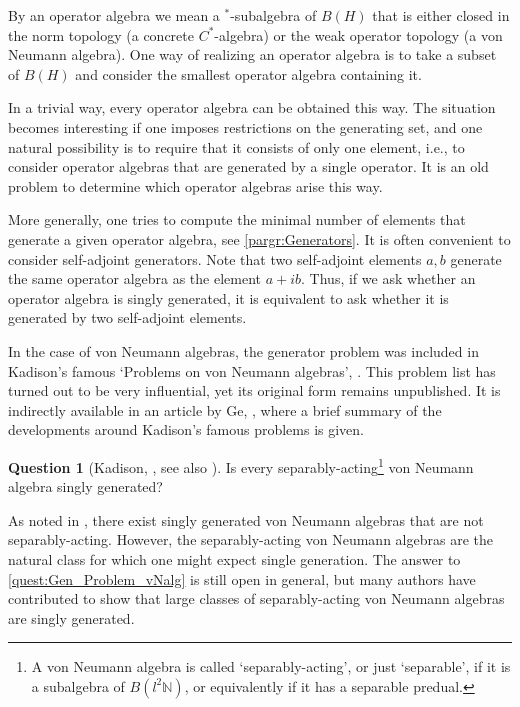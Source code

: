 \documentclass{amsart}
\theoremstyle{definition}
\newtheorem{quest}[questCt]{Question}
\begin{document}
    By an operator algebra we mean a $^{*}$-subalgebra of $B(H)$ that is either closed in the norm topology (a concrete {{$C^*$-al\-ge\-bra}}{}) or the weak operator topology (a von Neumann algebra).
    One way of realizing an operator algebra is to take a subset of $B(H)$ and consider the smallest operator algebra containing it.

    In a trivial way, every operator algebra can be obtained this way.
    The situation becomes interesting if one imposes restrictions on the generating set, and one natural possibility is to require that it consists of only one element, i.e., to consider operator algebras that are generated by a single operator.
    It is an old problem to determine which operator algebras arise this way.

    More generally, one tries to compute the minimal number of elements that generate a given operator algebra, see \ref{pargr:Generators}.
    It is often convenient to consider self-adjoint generators.
    Note that two self-adjoint elements $a,b$ generate the same operator algebra as the element $a+ib$.
    Thus, if we ask whether an operator algebra is singly generated, it is equivalent to ask whether it is generated by two self-adjoint elements.

    In the case of von Neumann algebras, the generator problem was included in Kadison's famous `Problems on von Neumann algebras', \cite{Kad1967}.
    This problem list has turned out to be very influential, yet its original form remains unpublished.
    It is indirectly available in an article by Ge, \cite{Ge2003}, where a brief summary of the developments around Kadison's famous problems is given.

\begin{quest}[{Kadison, \cite[Problem 14]{Kad1967}, see also \cite{Ge2003}}]
\label{quest:Gen_Problem_vNalg}
        Is every
separably-acting\footnote{A von Neumann algebra is called `separably-acting', or just `separable', if it is a subalgebra of $B(l^2{{\mathbb{N}}})$, or equivalently if it has a separable predual.}
        von Neumann algebra singly generated?
\end{quest}

    As noted in \cite{She2009}, there exist singly generated von Neumann algebras that are not sepa\-rably-acting.
    However, the separably-acting von Neumann algebras are the natural class for which one might expect single generation.
    The answer to \autoref{quest:Gen_Problem_vNalg} is still open in general, but many authors have contributed to show that large classes of separably-acting von Neumann algebras are singly generated.
\end{document}
